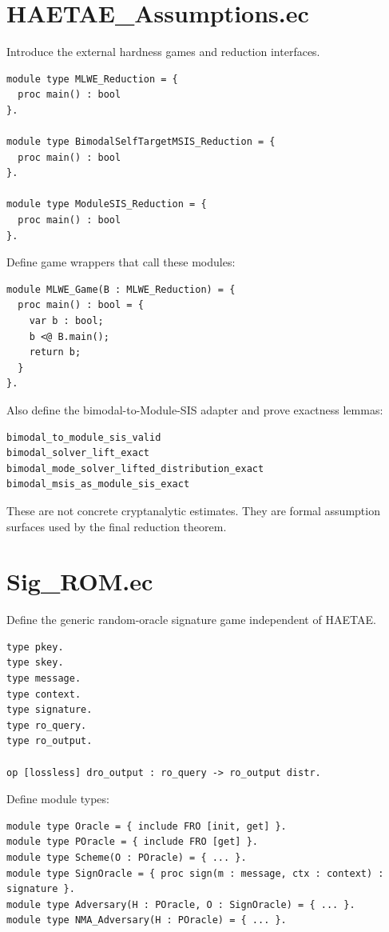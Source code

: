 \documentclass[11pt]{report}
\theoremstyle{definition}
\theoremstyle{plain}
\begin{document}
\section{HAETAE\_Assumptions.ec}

Introduce the external hardness games and reduction interfaces.

\begin{lstlisting}[language=EasyCrypt]
module type MLWE_Reduction = {
  proc main() : bool
}.

module type BimodalSelfTargetMSIS_Reduction = {
  proc main() : bool
}.

module type ModuleSIS_Reduction = {
  proc main() : bool
}.
\end{lstlisting}

Define game wrappers that call these modules:

\begin{lstlisting}[language=EasyCrypt]
module MLWE_Game(B : MLWE_Reduction) = {
  proc main() : bool = {
    var b : bool;
    b <@ B.main();
    return b;
  }
}.
\end{lstlisting}

Also define the bimodal-to-Module-SIS adapter and prove exactness lemmas:

\begin{lstlisting}[language=EasyCrypt]
bimodal_to_module_sis_valid
bimodal_solver_lift_exact
bimodal_mode_solver_lifted_distribution_exact
bimodal_msis_as_module_sis_exact
\end{lstlisting}

These are not concrete cryptanalytic estimates.  They are formal assumption
surfaces used by the final reduction theorem.

\section{Sig\_ROM.ec}

Define the generic random-oracle signature game independent of HAETAE.

\begin{lstlisting}[language=EasyCrypt]
type pkey.
type skey.
type message.
type context.
type signature.
type ro_query.
type ro_output.

op [lossless] dro_output : ro_query -> ro_output distr.
\end{lstlisting}

Define module types:

\begin{lstlisting}[language=EasyCrypt]
module type Oracle = { include FRO [init, get] }.
module type POracle = { include FRO [get] }.
module type Scheme(O : POracle) = { ... }.
module type SignOracle = { proc sign(m : message, ctx : context) : signature }.
module type Adversary(H : POracle, O : SignOracle) = { ... }.
module type NMA_Adversary(H : POracle) = { ... }.
\end{lstlisting}
\end{document}
